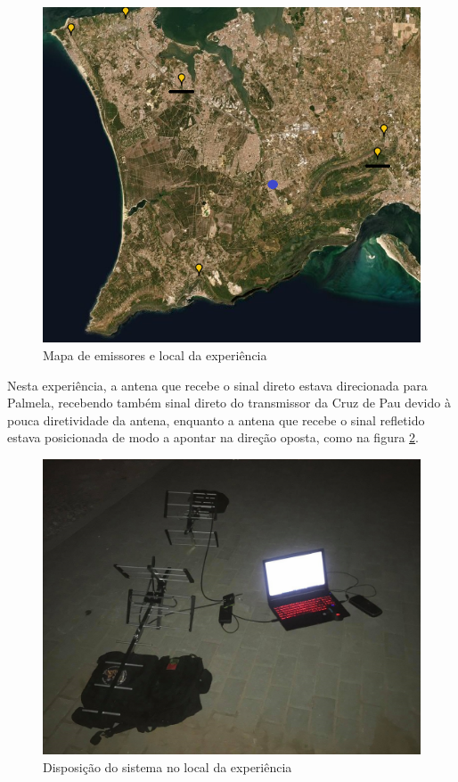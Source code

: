 \begin{figure}[h]
\centering
\includegraphics[scale=0.75]{chapters/ch5/assets/mapaemi}
\caption[Mapa de emissores e local da experiência]{Mapa de emissores e local da experiência}
\label{fig:mapaemi}
\end{figure}

Nesta experiência, a antena que recebe o sinal direto estava direcionada para Palmela, recebendo também sinal direto do transmissor da Cruz de Pau devido à pouca diretividade da antena, enquanto a antena que recebe o sinal refletido estava posicionada de modo a apontar na direção oposta, como na figura \ref{fig:prat}.

\begin{figure}[h]
\centering
\includegraphics[scale=0.3]{chapters/ch5/assets/prat}
\caption[Disposição do sistema]{Disposição do sistema no local da experiência}
\label{fig:prat}
\end{figure}

